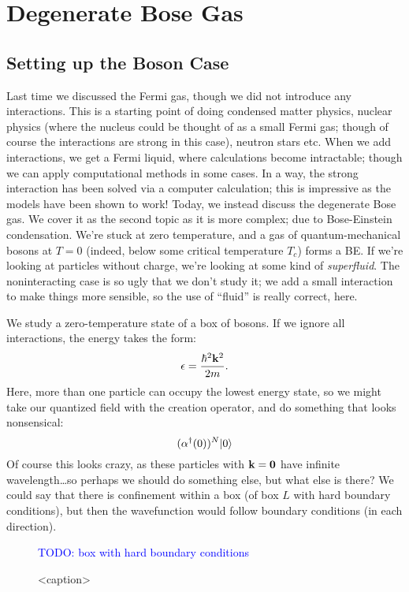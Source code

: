 \section{Degenerate Bose Gas}
\subsection{Setting up the Boson Case}
Last time we discussed the Fermi gas, though we did not introduce any interactions. This is a starting point of doing condensed matter physics, nuclear physics (where the nucleus could be thought of as a small Fermi gas; though of course the interactions are strong in this case), neutron stars etc. When we add interactions, we get a Fermi liquid, where calculations become intractable; though we can apply computational methods in some cases. In a way, the strong interaction has been solved via a computer calculation; this is impressive as the models have been shown to work! Today, we instead discuss the degenerate Bose gas. We cover it as the second topic as it is more complex; due to Bose-Einstein condensation. We're stuck at zero temperature, and a gas of quantum-mechanical bosons at $T = 0$ (indeed, below some critical temperature $T_c$) forms a BE. If we're looking at particles without charge, we're looking at some kind of \emph{superfluid}. The noninteracting case is so ugly that we don't study it; we add a small interaction to make things more sensible, so the use of ``fluid'' is really correct, here.

We study a zero-temperature state of a box of bosons. If we ignore all interactions, the energy takes the form:
\begin{equation}
    \epsilon = \frac{\hbar^2\mathbf{k}^2}{2m}.
\end{equation}
Here, more than one particle can occupy the lowest energy state, so we might take our quantized field with the creation operator, and do something that looks nonsensical:
\begin{equation}
    (\alpha^\dagger(0))^N\lvert 0 \rangle
\end{equation}
Of course this looks crazy, as these particles with $\mathbf{k} = \mathbf{0}$ have infinite wavelength\dots so perhaps we should do something else, but what else is there? We could say that there is confinement within a box (of box $L$ with hard boundary conditions), but then the wavefunction would follow boundary conditions (in each direction).

\begin{figure}[htbp]
    \centering

    \textcolor{blue}{TODO: box with hard boundary conditions}
    \caption{<caption>}
    \label{<label>}
\end{figure}


